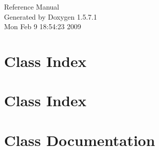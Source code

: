 \documentclass[a4paper]{book}
\begin{document}
\begin{titlepage}
\vspace*{7cm}
\begin{center}
{\Large Reference Manual}\\
\vspace*{1cm}
{\large Generated by Doxygen 1.5.7.1}\\
\vspace*{0.5cm}
{\small Mon Feb 9 18:54:23 2009}\\
\end{center}
\end{titlepage}
\clearemptydoublepage
{}
\tableofcontents
\clearemptydoublepage
{}
\chapter{Class Index}

\chapter{Class Index}

\chapter{Class Documentation}


























\printindex
\end{document}
